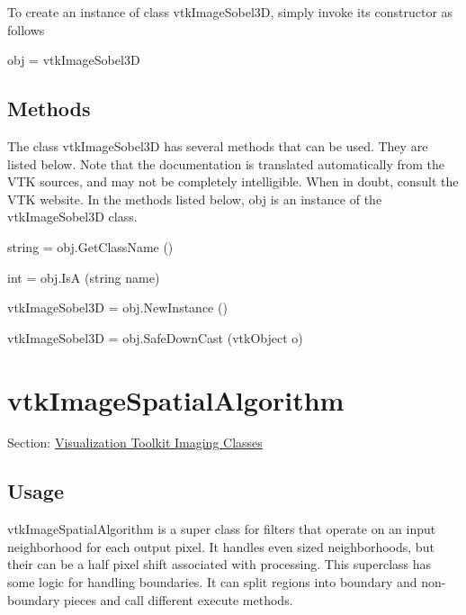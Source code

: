 To create an instance of class vtk\-Image\-Sobel3\-D, simply invoke its constructor as follows \begin{DoxyVerb}  obj = vtkImageSobel3D
\end{DoxyVerb}
 \hypertarget{vtkwidgets_vtkxyplotwidget_Methods}{}\subsection{Methods}\label{vtkwidgets_vtkxyplotwidget_Methods}
The class vtk\-Image\-Sobel3\-D has several methods that can be used. They are listed below. Note that the documentation is translated automatically from the V\-T\-K sources, and may not be completely intelligible. When in doubt, consult the V\-T\-K website. In the methods listed below, {\ttfamily obj} is an instance of the vtk\-Image\-Sobel3\-D class. 
\begin{DoxyItemize}
\item {\ttfamily string = obj.\-Get\-Class\-Name ()}  
\item {\ttfamily int = obj.\-Is\-A (string name)}  
\item {\ttfamily vtk\-Image\-Sobel3\-D = obj.\-New\-Instance ()}  
\item {\ttfamily vtk\-Image\-Sobel3\-D = obj.\-Safe\-Down\-Cast (vtk\-Object o)}  
\end{DoxyItemize}\hypertarget{vtkimaging_vtkimagespatialalgorithm}{}\section{vtk\-Image\-Spatial\-Algorithm}\label{vtkimaging_vtkimagespatialalgorithm}
Section\-: \hyperlink{sec_vtkimaging}{Visualization Toolkit Imaging Classes} \hypertarget{vtkwidgets_vtkxyplotwidget_Usage}{}\subsection{Usage}\label{vtkwidgets_vtkxyplotwidget_Usage}
vtk\-Image\-Spatial\-Algorithm is a super class for filters that operate on an input neighborhood for each output pixel. It handles even sized neighborhoods, but their can be a half pixel shift associated with processing. This superclass has some logic for handling boundaries. It can split regions into boundary and non-\/boundary pieces and call different execute methods.

